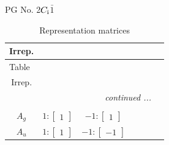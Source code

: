 \documentclass[fleqn,8pt,landscape]{jsarticle}
\begin{document}
\setcounter{MaxMatrixCols}{32}

\renewcommand{\tablename}{Table~}
\renewcommand{\figurename}{Figure~}
\begin{center}
\LARGE
PG No. 2\quad$C_{\rm i}$\quad$\bar{1}$\quad[ triclinic ]
\end{center}
\renewcommand{\arraystretch}{1.2}
\begin{longtable}{ccccccc}
\caption{Representation matrices}
 \\
 \hline \hline
Irrep. &  &  &  &  &  &  \\ \hline \endfirsthead

\multicolumn{6}{l}{\tablename\ \thetable{}} \\
 \hline \hline
Irrep. &  &  &  &  &  &  \\ \hline \endhead

 \hline \hline
\multicolumn{6}{r}{\footnotesize\it continued ...} \\ \endfoot

 \hline \hline
\multicolumn{6}{r}{} \\ \endlastfoot

$ A_{g} $ & $ 1:\begin{bmatrix} 1 \end{bmatrix} $ & $ -1:\begin{bmatrix} 1 \end{bmatrix} $ \\ \hline
$ A_{u} $ & $ 1:\begin{bmatrix} 1 \end{bmatrix} $ & $ -1:\begin{bmatrix} -1 \end{bmatrix} $ \\
\end{longtable}
\end{document}
